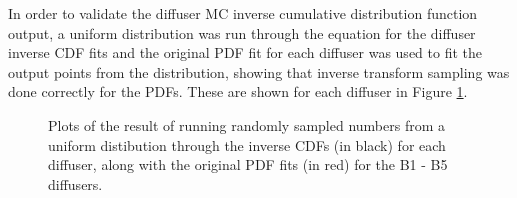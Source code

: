 In order to validate the diffuser MC inverse cumulative distribution function output, a uniform distribution was run through the equation for the diffuser inverse CDF fits and the original PDF fit for each diffuser was used to fit the output points from the distribution, showing that inverse transform sampling was done correctly for the PDFs. These are shown for each diffuser in Figure \ref{fig:inv_cdf_check}. 

\begin{figure}[!htbp]
    \centering
    
    \caption{Plots of the result of running randomly sampled numbers from a uniform distibution through the inverse CDFs (in black) for each diffuser, along with the original PDF fits (in red) for the B1 - B5 diffusers.}\label{fig:inv_cdf_check}
    
    \hfill
    \hfill
    
    \hspace*{0.005\textwidth}%
    
\end{figure}

